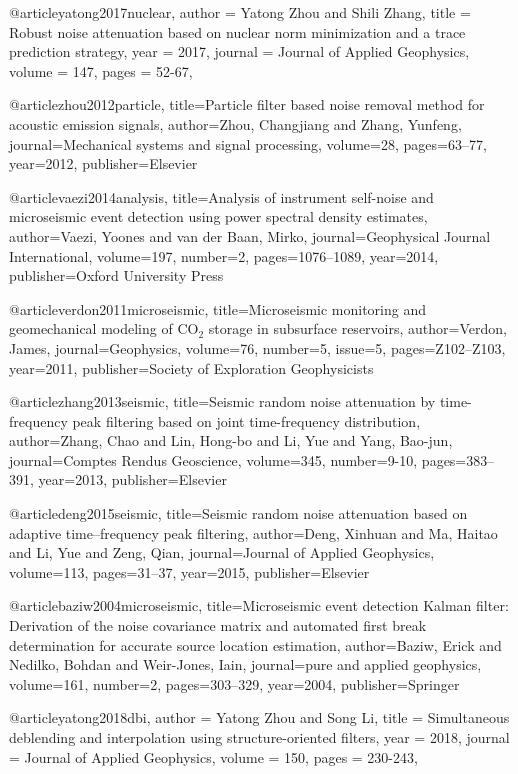 @article{yatong2017nuclear,
  author =	 {Yatong Zhou and Shili Zhang},
  title =	 {Robust noise attenuation based on nuclear norm minimization and a trace prediction strategy},
  year =	 2017,
  journal =	 {Journal of Applied Geophysics},
  volume =	 147,
  pages =	 {52-67},
}

@article{zhou2012particle,
  title={Particle filter based noise removal method for acoustic emission signals},
  author={Zhou, Changjiang and Zhang, Yunfeng},
  journal={Mechanical systems and signal processing},
  volume={28},
  pages={63--77},
  year={2012},
  publisher={Elsevier}
}

@article{vaezi2014analysis,
  title={Analysis of instrument self-noise and microseismic event detection using power spectral density estimates},
  author={Vaezi, Yoones and van der Baan, Mirko},
  journal={Geophysical Journal International},
  volume={197},
  number={2},
  pages={1076--1089},
  year={2014},
  publisher={Oxford University Press}
}

  @article{verdon2011microseismic,
  title={Microseismic monitoring and geomechanical modeling of {CO}$_2$ storage in subsurface reservoirs},
  author={Verdon, James},
  journal={Geophysics},
  volume={76},
  number={5},
  issue=5,
  pages={Z102--Z103},
  year={2011},
  publisher={Society of Exploration Geophysicists}
}

@article{zhang2013seismic,
  title={Seismic random noise attenuation by time-frequency peak filtering based on joint time-frequency distribution},
  author={Zhang, Chao and Lin, Hong-bo and Li, Yue and Yang, Bao-jun},
  journal={Comptes Rendus Geoscience},
  volume={345},
  number={9-10},
  pages={383--391},
  year={2013},
  publisher={Elsevier}
}

@article{deng2015seismic,
  title={Seismic random noise attenuation based on adaptive time--frequency peak filtering},
  author={Deng, Xinhuan and Ma, Haitao and Li, Yue and Zeng, Qian},
  journal={Journal of Applied Geophysics},
  volume={113},
  pages={31--37},
  year={2015},
  publisher={Elsevier}
}

@article{baziw2004microseismic,
  title={Microseismic event detection Kalman filter: Derivation of the noise covariance matrix and automated first break determination for accurate source location estimation},
  author={Baziw, Erick and Nedilko, Bohdan and Weir-Jones, Iain},
  journal={pure and applied geophysics},
  volume={161},
  number={2},
  pages={303--329},
  year={2004},
  publisher={Springer}
}

@article{yatong2018dbi,
  author =	 {Yatong Zhou and Song Li},
  title =	 {Simultaneous deblending and interpolation using structure-oriented filters},
  year =	 2018,
  journal =	 {Journal of Applied Geophysics},
  volume =	 150,
  pages =	 {230-243},
}

